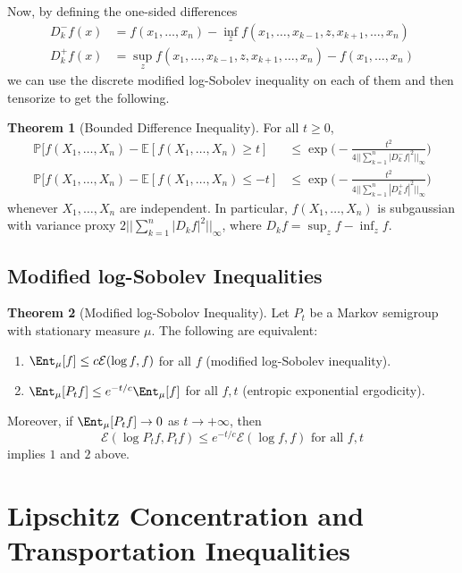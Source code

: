 \documentclass{article}
\theoremstyle{definition}
\newtheorem{theorem}{Theorem}[section]
\theoremstyle{remark}
\theoremstyle{definition}
\begin{document}
  Now, by defining the one-sided differences 
  \begin{align*}
      D_k^- f (x) & = f(x_1, \ldots, x_n) - \inf_z f (x_1, \ldots, x_{k-1}, z, x_{k+1}, \ldots, x_n) \\
      D_k^+ f (x) & = \sup_z f (x_1, \ldots, x_{k-1}, z, x_{k+1}, \ldots, x_n) - f(x_1, \ldots, x_n) 
  \end{align*}
  we can use the discrete modified log-Sobolev inequality on each of them and then tensorize to get the following. 

  \begin{theorem}[Bounded Difference Inequality]
  For all $t \geq 0$, 
  \begin{align*}
      \mathbb{P}[ f(X_1, \ldots, X_n) - \mathbb{E}[f(X_1, \ldots, X_n) \geq t] & \leq \exp \bigg( -\frac{t^2}{4 || \sum_{k=1}^n |D_k^- f|^2||_\infty} \bigg) \\
      \mathbb{P}[ f(X_1, \ldots, X_n) - \mathbb{E}[f(X_1, \ldots, X_n) \leq -t] & \leq \exp \bigg( -\frac{t^2}{4 || \sum_{k=1}^n |D_k^+ f|^2||_\infty} \bigg) 
  \end{align*}
  whenever $X_1, \ldots, X_n$ are independent. In particular, $f(X_1, \ldots, X_n)$ is subgaussian with variance proxy $2 ||\sum_{k=1}^n |D_k f|^2 ||_\infty$, where $D_k f = \sup_z f - \inf_z f$. 
  \end{theorem}

  \subsection{Modified log-Sobolev Inequalities}

  \begin{theorem}[Modified log-Sobolov Inequality]
  Let $P_t$ be a Markov semigroup with stationary measure $\mu$. The following are equivalent: 
  \begin{enumerate}
      \item $\Ent_\mu [f] \leq c \mathcal{E}(\log f, f)$ for all $f$ (modified log-Sobolev inequality). 
      \item $\Ent_\mu [P_t f] \leq e^{-t/c} \Ent_\mu [f]$ for all $f, t$ (entropic exponential ergodicity). 
  \end{enumerate}
  Moreover, if $\Ent_\mu [P_t f] \rightarrow 0$ as $t \rightarrow +\infty$, then 
  \[\mathcal{E}(\log P_t f, P_t f) \leq e^{-t/c} \mathcal{E}(\log f, f) \text{ for all } f, t\]
  implies $1$ and $2$ above. 
  \end{theorem}

\section{Lipschitz Concentration and Transportation Inequalities}
\end{document}
